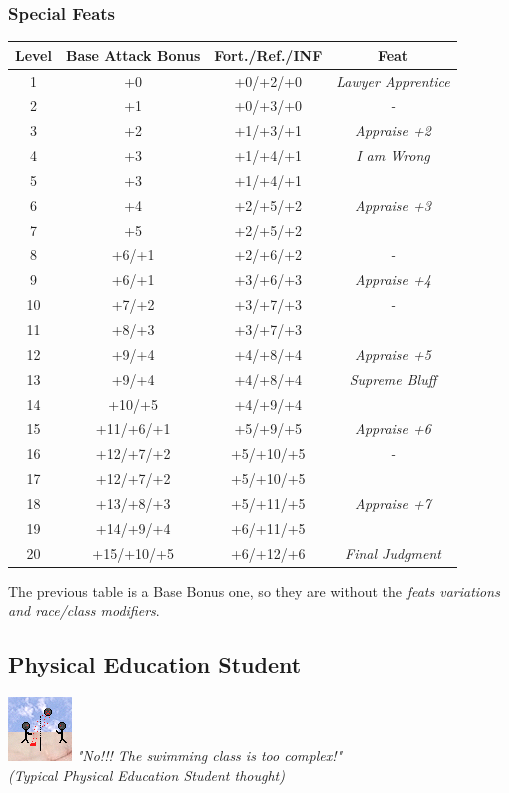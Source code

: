 \documentclass[ letterpaper,12pt]{article}
\begin{document}
\subsubsection{Special Feats}

\begin{center} \begin{tabular}{|c||c|c|c|}
\hline
{\bf Level}&{\bf Base Attack Bonus}&{\bf Fort./Ref./INF}&{\bf Feat}\\
\hline
1&+0&+0/+2/+0&{\it Lawyer Apprentice}\\
\hline
2&+1&+0/+3/+0&{\it - }\\
\hline
3&+2&+1/+3/+1&{\it Appraise +2}\\
\hline
4&+3&+1/+4/+1&{\it I am Wrong}\\
\hline
5&+3&+1/+4/+1&{\it }\\
\hline
6&+4&+2/+5/+2&{\it Appraise +3}\\
\hline
7&+5&+2/+5/+2&{\it }\\
\hline
8&+6/+1&+2/+6/+2&{\it - }\\
\hline
9 & +6/+1& +3/+6/+3 & {\it Appraise +4}\\
\hline
10 & +7/+2 & +3/+7/+3 & {\it -}\\
\hline
11 & +8/+3 & +3/+7/+3 & {\it }\\
\hline
12 & +9/+4 & +4/+8/+4 & {\it Appraise +5}\\
\hline
13 & +9/+4 & +4/+8/+4 & {\it Supreme Bluff}\\
\hline
14 & +10/+5 & +4/+9/+4 & {\it }\\
\hline
15 & +11/+6/+1 & +5/+9/+5 & {\it Appraise +6}\\
\hline
16 & +12/+7/+2 & +5/+10/+5 & {\it -}\\
\hline
17 & +12/+7/+2 & +5/+10/+5 & {\it }\\
\hline
18 & +13/+8/+3 & +5/+11/+5 & {\it Appraise +7}\\
\hline
19 & +14/+9/+4 & +6/+11/+5 & {\it }\\
\hline
20 & +15/+10/+5 & +6/+12/+6 & {\it Final Judgment}\\
\hline
\end{tabular} \end{center}

The previous table is a Base Bonus one, so they are without the {\it feats variations and race/class modifiers}.\\

\subsection{Physical Education Student}
\includegraphics{../data/classes/Img/edfisica.png}
{\it "No!!! The swimming class is too complex!"\\(Typical Physical Education Student thought)}\\
\end{document}
